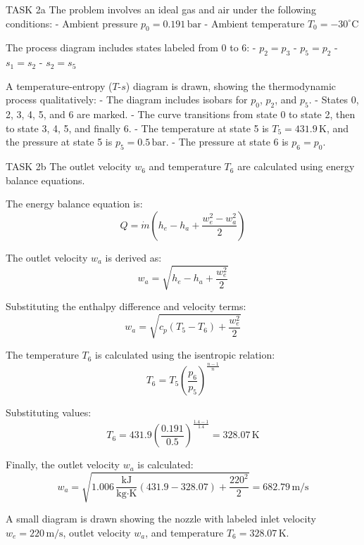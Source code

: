TASK 2a  
The problem involves an ideal gas and air under the following conditions:  
- Ambient pressure \( p_0 = 0.191 \, \text{bar} \)  
- Ambient temperature \( T_0 = -30^\circ\text{C} \)  

The process diagram includes states labeled from 0 to 6:  
- \( p_2 = p_3 \)  
- \( p_5 = p_2 \)  
- \( s_1 = s_2 \)  
- \( s_2 = s_5 \)  

A temperature-entropy (\( T \)-\( s \)) diagram is drawn, showing the thermodynamic process qualitatively:  
- The diagram includes isobars for \( p_0 \), \( p_2 \), and \( p_5 \).  
- States 0, 2, 3, 4, 5, and 6 are marked.  
- The curve transitions from state 0 to state 2, then to state 3, 4, 5, and finally 6.  
- The temperature at state 5 is \( T_5 = 431.9 \, \text{K} \), and the pressure at state 5 is \( p_5 = 0.5 \, \text{bar} \).  
- The pressure at state 6 is \( p_6 = p_0 \).  

TASK 2b  
The outlet velocity \( w_6 \) and temperature \( T_6 \) are calculated using energy balance equations.  

The energy balance equation is:  
\[
Q = \dot{m} \left( h_e - h_a + \frac{w_e^2 - w_a^2}{2} \right)
\]  

The outlet velocity \( w_a \) is derived as:  
\[
w_a = \sqrt{h_e - h_a + \frac{w_e^2}{2}}
\]  

Substituting the enthalpy difference and velocity terms:  
\[
w_a = \sqrt{c_p (T_5 - T_6) + \frac{w_e^2}{2}}
\]  

The temperature \( T_6 \) is calculated using the isentropic relation:  
\[
T_6 = T_5 \left( \frac{p_6}{p_5} \right)^{\frac{n-1}{n}}
\]  

Substituting values:  
\[
T_6 = 431.9 \left( \frac{0.191}{0.5} \right)^{\frac{1.4 - 1}{1.4}} = 328.07 \, \text{K}
\]  

Finally, the outlet velocity \( w_a \) is calculated:  
\[
w_a = \sqrt{1.006 \, \frac{\text{kJ}}{\text{kg·K}} (431.9 - 328.07) + \frac{220^2}{2}} = 682.79 \, \text{m/s}
\]  

A small diagram is drawn showing the nozzle with labeled inlet velocity \( w_e = 220 \, \text{m/s} \), outlet velocity \( w_a \), and temperature \( T_6 = 328.07 \, \text{K} \).